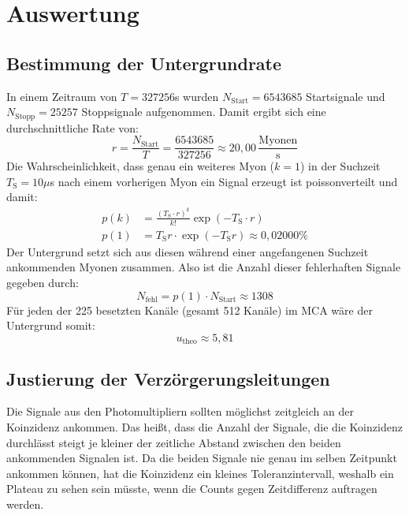 \newpage
\section{Auswertung}
    \subsection{Bestimmung der Untergrundrate}
        In einem Zeitraum von $T = 327256$s wurden $N_{\text{Start}} = 6543685$ Startsignale und $N_{\text{Stopp}} = 25257$
        Stoppsignale aufgenommen. Damit ergibt sich eine durchschnittliche Rate von:
        \begin{equation*}
            r = \frac{N_{\text{Start}}}{T} = \frac{6543685}{327256} \approx 20,00 \, \frac{\text{Myonen}}{\text{s}}
        \end{equation*}
        Die Wahrscheinlichkeit, dass genau ein weiteres Myon ($k = 1$) in der Suchzeit $T_\text{S} = 10\mu$s nach einem vorherigen Myon ein Signal erzeugt ist poissonverteilt und damit:
        \begin{align*}
            p(k) &= \frac{(T_{\text{S}} \cdot r)^k}{k!} \exp\left(-T_{\text{S}} \cdot r\right) \\[10pt]
            p(1) &= T_{\text{S}} r \cdot \exp\left(-T_{\text{S}}  r\right) \approx 0,02000 \%
        \end{align*}
        Der Untergrund setzt sich aus diesen während einer angefangenen Suchzeit ankommenden Myonen zusammen. Also ist die Anzahl dieser fehlerhaften Signale gegeben durch:
        \begin{equation*}
            N_{\text{fehl}} = p(1) \cdot N_{\text{Start}} \approx 1308
        \end{equation*}
        Für jeden der 225 besetzten Kanäle (gesamt 512 Kanäle) im MCA wäre der Untergrund somit:
        \begin{equation*}
            u_{\text{theo}} \approx 5,81
        \end{equation*}

    \subsection{Justierung der Verzörgerungsleitungen}
        Die Signale aus den Photomultipliern sollten möglichst zeitgleich an der Koinzidenz ankommen. Das heißt, dass die Anzahl der Signale, die die Koinzidenz durchlässt steigt je kleiner der zeitliche Abstand zwischen den beiden ankommenden Signalen ist. Da die beiden Signale nie genau im selben Zeitpunkt ankommen können, hat die Koinzidenz ein kleines Toleranzintervall, weshalb ein Plateau zu sehen sein müsste, wenn die Counts gegen Zeitdifferenz auftragen werden.
        
